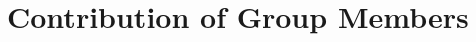 \documentclass[letterpaper, 11pt]{article}%
\begin{document}
\section{Contribution of Group Members}

\newpage


\end{document}
